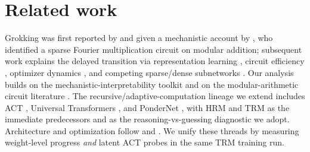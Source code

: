 \section{Related work}
\label{sec:related}
Grokking was first reported by \citet{power2022grokking} and given a mechanistic
account by \citet{nanda2023progress}, who identified a sparse Fourier
multiplication circuit on modular addition; subsequent work explains the delayed
transition via representation learning \citep{liu2022understanding}, circuit
efficiency \citep{varma2023grokking}, optimizer dynamics \citep{thilak2022slingshot},
and competing sparse/dense subnetworks \citep{merrill2023tale}. Our analysis
builds on the mechanistic-interpretability toolkit
\citep{elhage2021mathematical,olah2020zoom,wang2022interpretability,conmy2023automated}
and on the modular-arithmetic circuit literature
\citep{zhong2023clock,gromov2023grokking,chughtai2023toy}. The
recursive/adaptive-computation lineage we extend includes ACT
\citep{graves2016act}, Universal Transformers \citep{dehghani2019universal}, and
PonderNet \citep{banino2021pondernet}, with HRM \citep{wang2025hrm} and TRM
\citep{jolicoeur2025less} as the immediate predecessors and \citet{ren2026reasoning}
as the reasoning-vs-guessing diagnostic we adopt. Architecture and optimization
follow \citet{vaswani2017attention} and \citet{loshchilov2019adamw}. We unify
these threads by measuring weight-level progress \emph{and} latent ACT probes in
the same TRM training run.
